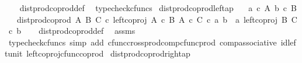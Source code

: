 \begin{isabellebody}
%
\isadelimproof
\ \ %
\endisadelimproof
%
\isatagproof
{}\isamarkupfalse%
\ dist{\isacharunderscore}{\kern0pt}prod{\isacharunderscore}{\kern0pt}coprod{\isacharunderscore}{\kern0pt}def\ \isamarkupfalse%
\ typecheck{\isacharunderscore}{\kern0pt}cfuncs%
\endisatagproof
{\isafoldproof}%
%
\isadelimproof
\isanewline
%
\endisadelimproof
\isanewline
{}\isamarkupfalse%
\ dist{\isacharunderscore}{\kern0pt}prod{\isacharunderscore}{\kern0pt}coprod{\isacharunderscore}{\kern0pt}left{\isacharunderscore}{\kern0pt}ap{\isacharcolon}{\kern0pt}\isanewline
\ \ \ {\isachardoublequoteopen}a\ {\isasymin}\isactrlsub c\ A{\isachardoublequoteclose}\ {\isachardoublequoteopen}b\ {\isasymin}\isactrlsub c\ B{\isachardoublequoteclose}\isanewline
\ \ \ {\isachardoublequoteopen}dist{\isacharunderscore}{\kern0pt}prod{\isacharunderscore}{\kern0pt}coprod\ A\ B\ C\ {\isasymcirc}\isactrlsub c\ left{\isacharunderscore}{\kern0pt}coproj\ {\isacharparenleft}{\kern0pt}A\ {\isasymtimes}\isactrlsub c\ B{\isacharparenright}{\kern0pt}\ {\isacharparenleft}{\kern0pt}A\ {\isasymtimes}\isactrlsub c\ C{\isacharparenright}{\kern0pt}\ {\isasymcirc}\isactrlsub c\ {\isasymlangle}a{\isacharcomma}{\kern0pt}\ b{\isasymrangle}\ {\isacharequal}{\kern0pt}\ {\isasymlangle}a{\isacharcomma}{\kern0pt}\ left{\isacharunderscore}{\kern0pt}coproj\ B\ C\ {\isasymcirc}\isactrlsub c\ b{\isasymrangle}{\isachardoublequoteclose}\isanewline
%
\isadelimproof
\ \ %
\endisadelimproof
%
\isatagproof
{}\isamarkupfalse%
\ dist{\isacharunderscore}{\kern0pt}prod{\isacharunderscore}{\kern0pt}coprod{\isacharunderscore}{\kern0pt}def\ \isamarkupfalse%
\ assms\ \isanewline
\ \ \isamarkupfalse%
\ {\isacharparenleft}{\kern0pt}typecheck{\isacharunderscore}{\kern0pt}cfuncs{\isacharcomma}{\kern0pt}\ simp\ add{\isacharcolon}{\kern0pt}\ cfunc{\isacharunderscore}{\kern0pt}cross{\isacharunderscore}{\kern0pt}prod{\isacharunderscore}{\kern0pt}comp{\isacharunderscore}{\kern0pt}cfunc{\isacharunderscore}{\kern0pt}prod\ comp{\isacharunderscore}{\kern0pt}associative{}\ id{\isacharunderscore}{\kern0pt}left{\isacharunderscore}{\kern0pt}unit{}\ left{\isacharunderscore}{\kern0pt}coproj{\isacharunderscore}{\kern0pt}cfunc{\isacharunderscore}{\kern0pt}coprod{\isacharparenright}{\kern0pt}%
\endisatagproof
{\isafoldproof}%
%
\isadelimproof
\isanewline
%
\endisadelimproof
\isanewline
{}\isamarkupfalse%
\ dist{\isacharunderscore}{\kern0pt}prod{\isacharunderscore}{\kern0pt}coprod{\isacharunderscore}{\kern0pt}right{\isacharunderscore}{\kern0pt}ap{\isacharcolon}{\kern0pt}\isanewline

\end{isabellebody}
